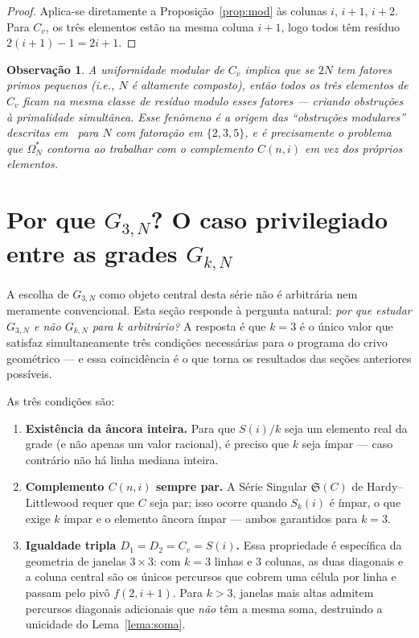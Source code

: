 \documentclass[12pt, a4paper]{article}
\newtheorem{observacao}[lema]{Observação}
\begin{document}
	\begin{proof}
		Aplica-se diretamente a Proposição~\ref{prop:mod} às colunas $i$, $i+1$, $i+2$.
		Para $C_v$, os três elementos estão na mesma coluna $i+1$, logo todos têm
		resíduo $2(i+1)-1=2i+1$.
	\end{proof}
	
	\begin{observacao}
		A uniformidade modular de $C_v$ implica que se $2N$ tem fatores primos pequenos
		(i.e., $N$ é altamente composto), então todos os três elementos de $C_v$ ficam na
		mesma classe de resíduo modulo esses fatores — criando obstruções à primalidade
		simultânea. Esse fenômeno é a origem das ``obstruções modulares'' descritas
		em~\cite{bandeira2026} para $N$ com fatoração em $\{2,3,5\}$, e é precisamente
		o problema que $\Omega^*_N$ contorna ao trabalhar com o complemento $C(n,i)$ em
		vez dos próprios elementos.
	\end{observacao}
	
	\section{Por que $G_{3,N}$? O caso privilegiado entre as grades $G_{k,N}$}
	\label{sec:general}
	
	A escolha de $G_{3,N}$ como objeto central desta série não é arbitrária nem
	meramente convencional. Esta seção responde à pergunta natural: \emph{por que estudar $G_{3,N}$
		e não $G_{k,N}$ para $k$ arbitrário?} A resposta é que $k=3$ é o único
	valor que satisfaz simultaneamente três condições necessárias para o programa
	do crivo geométrico — e essa coincidência é o que torna os resultados das
	seções anteriores possíveis.
	
	As três condições são:
	\begin{enumerate}
		\item \textbf{Existência da âncora inteira.} Para que $S(i)/k$ seja um elemento
		real da grade (e não apenas um valor racional), é preciso que $k$ seja
		ímpar — caso contrário não há linha mediana inteira.
		\item \textbf{Complemento $C(n,i)$ sempre par.} A Série Singular
		$\mathfrak{S}(C)$ de Hardy–Littlewood requer que $C$ seja par;
		isso ocorre quando $S_k(i)$ é ímpar, o que exige $k$ ímpar e o
		elemento âncora ímpar — ambos garantidos para $k=3$.
		\item \textbf{Igualdade tripla $D_1=D_2=C_v=S(i)$.} Essa propriedade é
		específica da geometria de janelas $3\times 3$: com $k=3$ linhas e
		$3$ colunas, as duas diagonais e a coluna central são os únicos
		percursos que cobrem uma célula por linha e passam pelo pivô
		$f(2,i+1)$. Para $k>3$, janelas mais altas admitem percursos
		diagonais adicionais que \emph{não} têm a mesma soma, destruindo
		a unicidade do Lema~\ref{lema:soma}.
	\end{enumerate}
	
\end{document}
